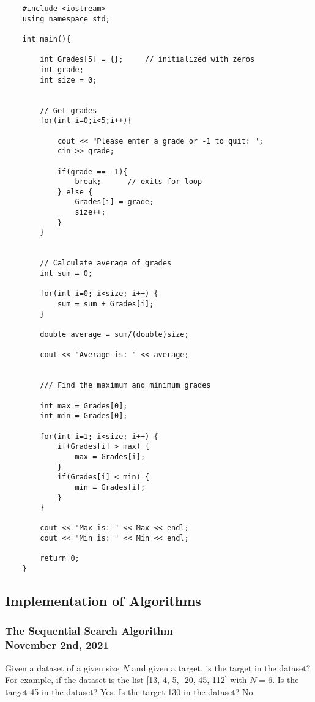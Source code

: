 \documentclass[]{article}
\begin{document}
\begin{lstlisting}
	#include <iostream>
	using namespace std;
	
	int main(){
		
		int Grades[5] = {}; 	// initialized with zeros
		int grade;
		int size = 0;
		

		// Get grades
		for(int i=0;i<5;i++){
			
			cout << "Please enter a grade or -1 to quit: ";
			cin >> grade;
			
			if(grade == -1){
				break;		// exits for loop
			} else {
				Grades[i] = grade;
				size++;
			}
		}
		
		
		// Calculate average of grades
		int sum = 0;
		
		for(int i=0; i<size; i++) {
			sum = sum + Grades[i];
		}
		
		double average = sum/(double)size;
		
		cout << "Average is: " << average;
		
		
		/// Find the maximum and minimum grades
		
		int max = Grades[0];
		int min = Grades[0];
		
		for(int i=1; i<size; i++) {
			if(Grades[i] > max) {
				max = Grades[i];
			}
			if(Grades[i] < min) {
				min = Grades[i];
			}
		}
		
		cout << "Max is: " << Max << endl;
		cout << "Min is: " << Min << endl;
	
		return 0;
	}
\end{lstlisting}\bigbreak

\subsection{Implementation of Algorithms}

\subsubsection{The Sequential Search Algorithm\\ {\normalfont November 2nd, 2021}} \label{sequentialsearchalgorithm}
\bigbreak

Given a dataset of a given size $N$ and given a target, is the target in the dataset?\\

For example, if the dataset is the list [13, 4, 5, -20, 45, 112] with $N = 6$. Is the target 45 in the dataset? Yes. Is the target 130 in the dataset? No. \\
\end{document}

